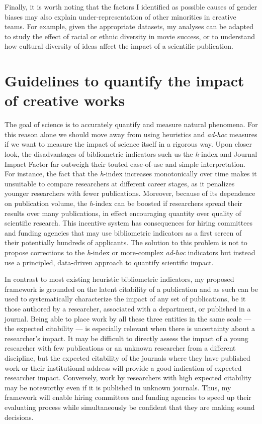 Finally, it is worth noting that the factors I identified as possible causes of gender biases may also explain under-representation of other minorities in creative teams. For example, given the appropriate datasets, my analyses can be adapted to study the effect of racial or ethnic diversity in movie success, or to understand how cultural diversity of ideas affect the impact of a scientific publication.


\section{Guidelines to quantify the impact of creative works}

The goal of science is to accurately quantify and measure natural phenomena. For this reason alone we should move away from using heuristics and \textit{ad-hoc} measures if we want to measure the impact of science itself in a rigorous way. Upon closer look, the disadvantages of bibliometric indicators such us the \emph{h}-index and Journal Impact Factor far outweigh their touted ease-of-use and simple interpretation. For instance, the fact that the \emph{h}-index increases monotonically over time makes it unsuitable to compare researchers at different career stages, as it penalizes younger researchers with fewer publications. Moreover, because of its dependence on publication volume, the \emph{h}-index can be boosted if researchers spread their results over many publications, in effect encouraging quantity over quality of scientific research. This incentive system has consequences for hiring committees and funding agencies that may use bibliometric indicators as a first screen of their potentially hundreds of applicants. The solution to this problem is not to propose corrections to the \emph{h}-index or more-complex \textit{ad-hoc} indicators but instead use a principled, data-driven approach to quantify scientific impact.

In contrast to most existing heuristic bibliometric indicators, my proposed framework is grounded on the latent citability of a publication and as such can be used to systematically characterize the impact of any set of publications, be it those authored by a researcher, associated with a department, or published in a journal. Being able to place work by all these three entities in the same scale --- the expected citability --- is especially relevant when there is uncertainty about a researcher's impact. It may be difficult to directly assess the impact of a young researcher with few publications or an unknown researcher from a different discipline, but the expected citability of the journals where they have published work or their institutional address will provide a good indication of expected researcher impact. Conversely, work by researchers with high expected citability may be noteworthy even if it is published in unknown journals. Thus, my framework will enable hiring committees and funding agencies to speed up their evaluating process while simultaneously be confident that they are making sound decisions.


